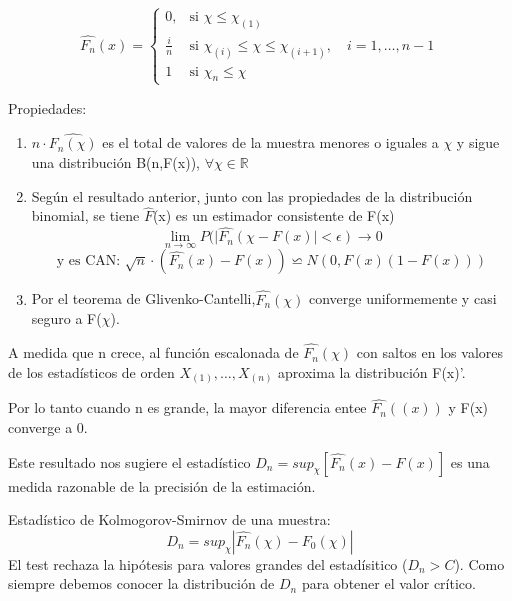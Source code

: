 \[
\widehat{F_n}(x)=
\left\{
\begin{array}{ll}
    0, & \text{si } \chi \leq \chi_{(1)}\\
    \frac{i}{n} & \text{si } \chi_{(i)} \leq \chi \leq \chi_{(i+1)}, \quad i=1,\dots,n-1 \\
    1 & \text{si } \chi_{n} \leq \chi
\end{array}
\right.
\]


Propiedades:
\begin{enumerate}
    \item $n\cdot \widehat{F_n(\chi)}$ es el total de valores de la muestra menores o iguales a $\chi$ y sigue una distribución B(n,F(x)), $\forall \chi \in \mathbb{R}$
    \item Según el resultado anterior, junto con las propiedades de la distribución binomial, se tiene $\widehat{F}$(x) es un estimador consistente de F(x)
    \[
    \lim_{n \to \infty} P(| \widehat{F_n}(\chi - F(x)| < \epsilon) \to 0
    \]
    \[
    \text{y es CAN: }\sqrt{n}\cdot(\widehat{F_n}(x)-F(x))\backsimeq N(0,F(x)(1-F(x)))
    \]
    \item Por el teorema de Glivenko-Cantelli,$\widehat{F_n}(\chi)$ converge uniformemente y casi seguro a F($\chi$).
\end{enumerate}

A medida que n crece, al función escalonada de $\widehat{F_n}(\chi)$ con saltos en los valores de los estadísticos de orden $X_{(1)},\dots,X_{(n)}$ aproxima la distribución F(x)'.

Por lo tanto cuando n es grande, la mayor diferencia entee $\widehat{F_n}((x))$ y F(x) converge a 0.

Este resultado nos sugiere el estadístico $
D_n=sup_\chi[\widehat{F_n}(x)-F(x)]
$ es una medida razonable de la precisión de la estimación.

Estadístico de Kolmogorov-Smirnov de una muestra:
\[
    D_n=sup_\chi|\widehat{F_n}(\chi)-F_0(\chi)|
\]
El test rechaza la hipótesis para valores grandes del estadísitico ($D_n>C$).
Como siempre debemos conocer la distribución de $D_n$ para obtener el valor crítico.
